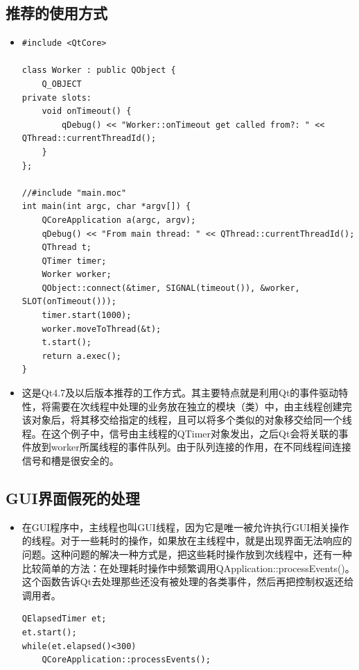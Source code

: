 \documentclass[9pt,b5paper]{article}
\begin{document}
\subsection{推荐的使用方式}
\label{sec-5-3}
\begin{itemize}
\item \lstset{language=java,label= ,caption= ,numbers=none}
\begin{lstlisting}
#include <QtCore>

class Worker : public QObject {
    Q_OBJECT
private slots:
    void onTimeout() {
        qDebug() << "Worker::onTimeout get called from?: " << QThread::currentThreadId();
    }
};
  
//#include "main.moc"
int main(int argc, char *argv[]) {
    QCoreApplication a(argc, argv);
    qDebug() << "From main thread: " << QThread::currentThreadId();
    QThread t;
    QTimer timer;
    Worker worker;
    QObject::connect(&timer, SIGNAL(timeout()), &worker, SLOT(onTimeout()));
    timer.start(1000);
    worker.moveToThread(&t);
    t.start();
    return a.exec();
}
\end{lstlisting}
\item 这是Qt4.7及以后版本推荐的工作方式。其主要特点就是利用Qt的事件驱动特性，将需要在次线程中处理的业务放在独立的模块（类）中，由主线程创建完该对象后，将其移交给指定的线程，且可以将多个类似的对象移交给同一个线程。在这个例子中，信号由主线程的QTimer对象发出，之后Qt会将关联的事件放到worker所属线程的事件队列。由于队列连接的作用，在不同线程间连接信号和槽是很安全的。
\end{itemize}
\subsection{GUI界面假死的处理}
\label{sec-5-4}
\begin{itemize}
\item 在GUI程序中，主线程也叫GUI线程，因为它是唯一被允许执行GUI相关操作的线程。对于一些耗时的操作，如果放在主线程中，就是出现界面无法响应的问题。这种问题的解决一种方式是，把这些耗时操作放到次线程中，还有一种比较简单的方法：在处理耗时操作中频繁调用QApplication::processEvents()。这个函数告诉Qt去处理那些还没有被处理的各类事件，然后再把控制权返还给调用者。

\lstset{language=java,label= ,caption= ,numbers=none}
\begin{lstlisting}
QElapsedTimer et;
et.start();
while(et.elapsed()<300)
    QCoreApplication::processEvents();
\end{lstlisting}
\end{itemize}
\end{document}
